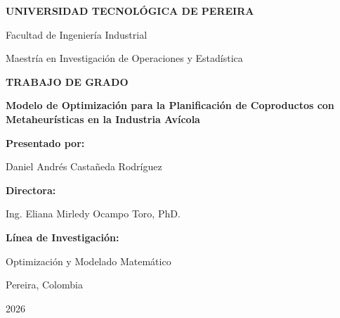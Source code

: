 \documentclass[
  spanish,
  12pt,
]{article}
\begin{document}
\begin{titlepage}
    \centering
    \thispagestyle{empty}
    
    \vspace*{1cm}
    
    {\large \textbf{UNIVERSIDAD TECNOLÓGICA DE PEREIRA}}
    
    \vspace{0.3cm}
    
    {\normalsize Facultad de Ingeniería Industrial}
    
    \vspace{0.3cm}
    
    {\normalsize Maestría en Investigación de Operaciones y Estadística}
    
    \vspace{2cm}
    
    {\Large \textbf{TRABAJO DE GRADO}}
    
    \vspace{1cm}
    
    {\large \textbf{Modelo de Optimización para la Planificación de Coproductos con Metaheurísticas en la Industria Avícola}}
    
    \vspace{2cm}
    
    {\normalsize \textbf{Presentado por:}}
    
    \vspace{0.3cm}
    
    Daniel Andrés Castañeda Rodríguez
    
    \vspace{1cm}
    
    {\normalsize \textbf{Directora:}}
    
    \vspace{0.3cm}
    
    Ing. Eliana Mirledy Ocampo Toro, PhD.
    
    \vspace{1cm}
    
    {\normalsize \textbf{Línea de Investigación:}}
    
    \vspace{0.3cm}
    
    Optimización y Modelado Matemático
    
    \vspace{2cm}
    
    Pereira, Colombia
    
    2026
    
\end{titlepage}
\end{document}
